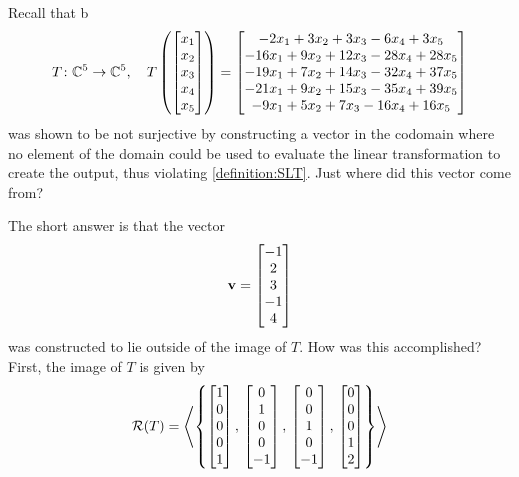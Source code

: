 \documentclass{ximera}
\begin{document}
\begin{example}

Recall that
b\[T\colon \mathbb{C}^{5}\rightarrow\mathbb{C}^{5},\quad
T\left(\begin{bmatrix}x_1\\x_2\\x_3\\x_4\\x_5\end{bmatrix}\right)=
\begin{bmatrix}-2 x_1 + 3 x_2 + 3 x_3 - 6 x_4 + 3 x_5\\
-16 x_1 + 9 x_2 + 12 x_3 - 28 x_4 + 28 x_5\\
-19 x_1 + 7 x_2 + 14 x_3 - 32 x_4 + 37 x_5\\
-21 x_1 + 9 x_2 + 15 x_3 - 35 x_4 + 39 x_5\\
-9 x_1 + 5 x_2 + 7 x_3 - 16 x_4 + 16 x_5\end{bmatrix}
\]
was shown to be not surjective by constructing a vector in the codomain where no element of the domain could be used to evaluate the linear transformation to create the output, thus violating \ref{definition:SLT}.  Just where did this vector come from?

The short answer is that the vector
\[
\mathbf{v}=\begin{bmatrix}-1\\2\\3\\-1\\4\end{bmatrix}
\]
was constructed to lie outside of the image of $T$.  How was this accomplished?  First, the image of $T$ is given by
\[
\mathcal{R}\!\left(T\right)=\left\langle\left\{
\begin{bmatrix}1\\0\\0\\0\\1\end{bmatrix},\,\begin{bmatrix}0\\1\\0\\0\\-1\end{bmatrix},\,
\begin{bmatrix}0\\0\\1\\0\\-1\end{bmatrix},\,\begin{bmatrix}0\\0\\0\\1\\2\end{bmatrix}
\right\}\right\rangle
\]


\end{example}
\end{document}
